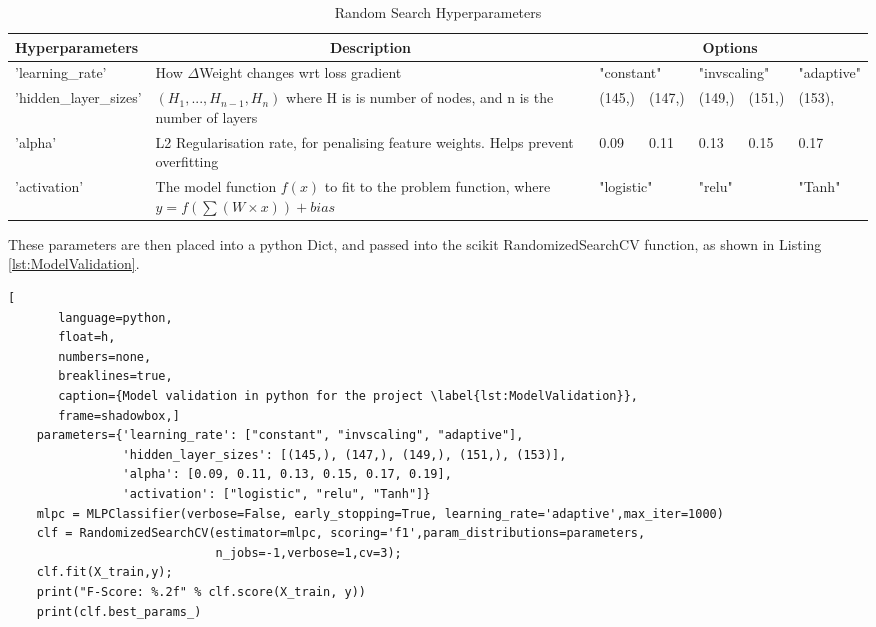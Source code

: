 \documentclass{UoNMCHA}
\newcommand{\lref}[1] {Listing \ref{#1}}
\numberwithin{equation}{section}
\begin{document}
\begin{table}[h]
    \begin{center}  
    \caption{Random Search Hyperparameters}\label{tab:RandCV_HyperOptions}
        \begin{tabular}{p{3cm}p{6.0cm}p{0.8cm}p{0.8cm}p{0.8cm}p{0.8cm}p{1.8cm}}%
            \hline\hline 
            Hyperparameters        & \multicolumn{1}{c}{Description}                                                            & \multicolumn{5}{c}{Options}                                \\
            \hline 
            'learning\_rate'       & How $\Delta$Weight changes wrt loss gradient                                               & \multicolumn{2}{l}{"constant"} & \multicolumn{2}{l}{"invscaling"} & "adaptive" \\ %
            'hidden\_layer\_sizes' & $(H_1, ..., H_{n-1}, H_n)$ where H is is number of nodes, and n is the number of layers    & (145,)     & (147,)       & (149,)     & (151,) & (153), \\
            'alpha'                & L2 Regularisation rate, for penalising feature weights. Helps prevent overfitting          & 0.09       & 0.11         & 0.13       & 0.15   & 0.17   \\
            'activation'           & The model function $f(x)$ to fit to the problem function,  where $y = f(\sum(W \times x)) + bias$                         & \multicolumn{2}{l}{"logistic"} & \multicolumn{2}{l}{"relu"}       & "Tanh"     \\%
            \hline 
        \end{tabular}
    \end{center}
\end{table}

These parameters are then placed into a python Dict, and passed into the scikit RandomizedSearchCV function, as shown in \lref{lst:ModelValidation}.

\begin{lstlisting}[
       language=python,
       float=h,
       numbers=none,
       breaklines=true,
       caption={Model validation in python for the project \label{lst:ModelValidation}},
       frame=shadowbox,]
    parameters={'learning_rate': ["constant", "invscaling", "adaptive"],
                'hidden_layer_sizes': [(145,), (147,), (149,), (151,), (153)],
                'alpha': [0.09, 0.11, 0.13, 0.15, 0.17, 0.19],
                'activation': ["logistic", "relu", "Tanh"]}
    mlpc = MLPClassifier(verbose=False, early_stopping=True, learning_rate='adaptive',max_iter=1000)
    clf = RandomizedSearchCV(estimator=mlpc, scoring='f1',param_distributions=parameters,
                             n_jobs=-1,verbose=1,cv=3);
    clf.fit(X_train,y);    
    print("F-Score: %.2f" % clf.score(X_train, y))
    print(clf.best_params_)
\end{lstlisting}
\end{document}
